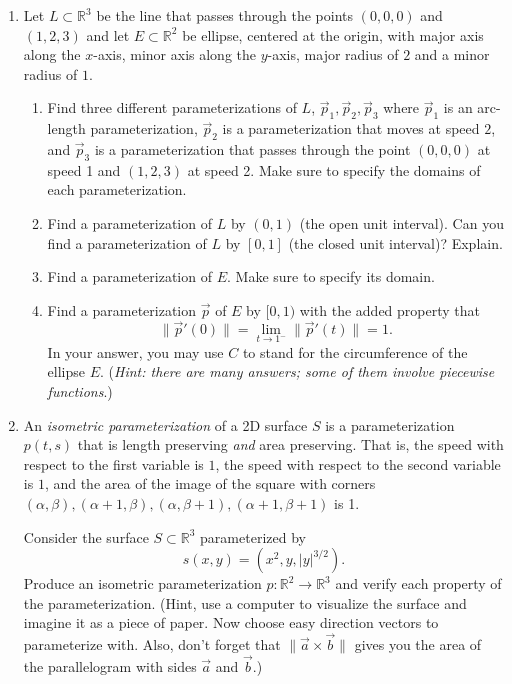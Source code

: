 \documentclass[letter]{article}
\newcommand{\setheader}[6]{
	\lhead{{\sc #1}\\{\sc #2} ({\small \it \today})}
	\rhead{
		{\bf #3} 
		\ifthenelse{\equal{#4}{}}{}{(#4)}\\
		{\bf #5} 
		\ifthenelse{\equal{#6}{}}{}{(#6)}%
	}
}
\newcommand{\R}{\mathbb{R}}
\begin{document}
	\setheader{Math 281-1}{Homework 3}{Due: Friday, October 14}{}{}{}
	\begin{enumerate}
		\item Let $L\subset \R^3$ be the line that passes through the points $(0,0,0)$ and $(1,2,3)$
			and let $E\subset \R^2$ be ellipse, centered at the origin, with major axis along
			the $x$-axis, minor axis along the $y$-axis, major radius of $2$ and a minor radius of $1$.
			\begin{enumerate}
				\item Find three different parameterizations of $L$, $\vec p_1,\vec p_2,\vec p_3$ where
					$\vec p_1$ is an arc-length parameterization, $\vec p_2$ is a parameterization
					that moves at speed $2$, and $\vec p_3$ is a parameterization that passes through
					the point $(0,0,0)$ at speed 1 and $(1,2,3)$ at speed 2.  Make sure to specify the domains
					of each parameterization.
				\item Find a parameterization of $L$ by $(0,1)$ (the open unit interval).  Can you find a
					parameterization of $L$ by $[0,1]$ (the closed unit interval)?  Explain.
				\item Find a parameterization of $E$.  Make sure to specify its domain.
				\item Find a parameterization $\vec p$ of $E$ by $[0,1)$ with the added property
						that 
						\[
							\|\vec p'(0)\|=\lim_{t\to 1^-}\|\vec p'(t)\|=1.
						\] In your answer,
						you may use $C$ to stand for the circumference of the ellipse $E$.
					(\emph{Hint: there are many answers; some of them involve piecewise functions}.)
			\end{enumerate}
		\item An \emph{isometric parameterization} of a 2D surface $S$ is a parameterization $p(t,s)$
			that is length preserving \emph{and} area preserving.
			That is, the speed with respect to the first variable
			is $1$, the speed with respect to the second variable is $1$, and the area of the image
			of the square with corners $(\alpha,\beta),(\alpha+1,\beta),(\alpha,\beta+1),(\alpha+1,\beta+1)$ is 1.

			Consider the surface $S\subset \R^3$ parameterized by \[
				s(x,y) = (x^2,y, |y|^{3/2}).
			\]
			Produce an isometric parameterization $p:\R^2\to\R^3$ and verify each 
			property of the parameterization. (Hint, use a computer to visualize the surface
			and imagine it as a piece of paper.  Now choose easy direction vectors to 
			parameterize with.  Also, don't forget that $\|\vec a\times \vec b\|$ gives you
			the area of the parallelogram with sides $\vec a$ and $\vec b$.)


\end{enumerate}
\end{document}
